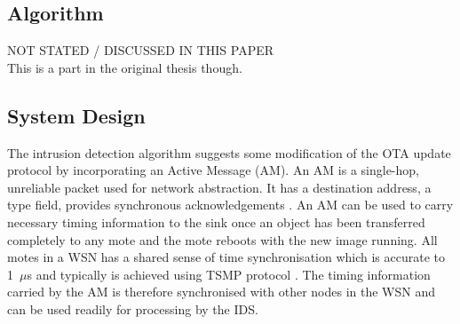 \documentclass[conference,final]{IEEEtran}
\begin{document}

\subsection{Algorithm}
\label{subsec:alg}
NOT STATED / DISCUSSED IN THIS PAPER\\
This is a part in the original thesis though.



\subsection{System Design}
\label{subsec:sysdeg}




The intrusion detection algorithm suggests some modification of the OTA update protocol by incorporating an Active Message (AM).
An AM is a single-hop, unreliable packet used for network abstraction. 
It has a destination address, a type  field, provides synchronous acknowledgements \cite{tep116}. 
An AM can be used to carry necessary timing information to the sink once an object has been transferred completely to any mote and the mote reboots with the new image running.
All motes in a WSN has a shared sense of time synchronisation which is accurate to 1~$\mu$s  and typically is achieved using TSMP protocol \cite{Pister08tsmp:time}.
The timing information carried by the AM is therefore synchronised with other nodes in the WSN and can be used readily for processing by the IDS.
\end{document}
